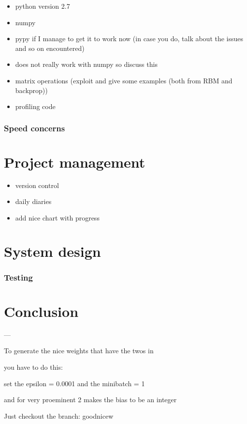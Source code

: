 \documentclass[11pt, fleqn, twoside]{article}
\begin{document}
\begin{itemize}
  \item python version 2.7
  \item numpy
  \item pypy if I manage to get it to work now (in case you do, talk about the issues and so on encountered)
  \item does not really work with numpy so discuss this
  \item matrix operations (exploit and give some examples (both from RBM and backprop))
  \item profiling code
\end{itemize}

\subsubsection{Speed concerns}

\section{ Project management}
\begin{itemize}
  \item version control
  \item daily diaries
  \item add nice chart with progress
\end{itemize}

\section{System design}

\subsubsection{ Testing}

\section{Conclusion}



---

To generate the nice weights that have the twos in

you have to do this:

set the epsilon = 0.0001 and the
minibatch = 1

and for very proeminent 2 makes the bias to be an integer

Just checkout the branch: goodnicew
\end{document}
